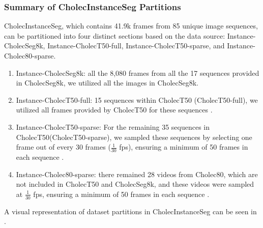 \subsubsection*{Summary of CholecInstanceSeg Partitions}
CholecInstanceSeg, which contains 41.9k frames from 85 unique image sequences, can be partitioned into four distinct sections based on the data source: Instance-CholecSeg8k, Instance-CholecT50-full, Instance-CholecT50-sparse, and Instance-Cholec80-sparse. 
%
%
\begin{enumerate}
    \item Instance-CholecSeg8k:  all the 8,080 frames from all the 17 sequences provided in CholecSeg8k, we utilized all the images in CholecSeg8k.
    \item Instance-CholecT50-full:   15 sequences within CholecT50 (CholecT50-full), we utilized all frames provided by CholecT50 for these  sequences .
    \item Instance-CholecT50-sparse: For the remaining 35 sequences in CholecT50(CholecT50-sparse), we sampled these sequences by selecting one frame out of every 30 frames ($\frac{1}{30}$ fps), ensuring a minimum of 50 frames in each sequence  . 
    \item Instance-Cholec80-sparse:  there remained 28 videos from Cholec80, which are not included in CholecT50 and CholecSeg8k, and these videos were sampled at $\frac{1}{30}$ fps, ensuring a minimum of 50 frames in each sequence  . 
\end{enumerate}
%
A visual representation of dataset partitions in CholecInstanceSeg can be seen in .



